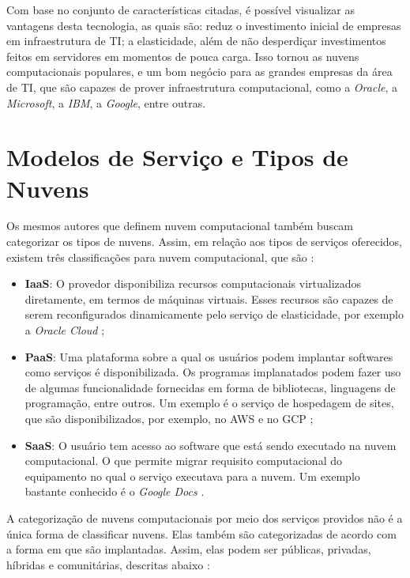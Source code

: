 Com base no conjunto de características citadas, é possível visualizar as vantagens desta tecnologia, as quais são: reduz o investimento inicial de empresas em infraestrutura de TI; a elasticidade, além de não desperdiçar investimentos feitos em servidores em momentos de pouca carga. Isso tornou as nuvens computacionais populares, e um bom negócio para as grandes empresas da área de \acrfull{TI}, que são capazes de prover infraestrutura computacional, como a \textit{Oracle}, a \textit{Microsoft}, a \textit{IBM}, a \textit{Google}, entre outras.

\section{Modelos de Serviço e Tipos de Nuvens}

Os mesmos autores que definem nuvem computacional também buscam categorizar os tipos de nuvens. Assim, em relação aos tipos de serviços oferecidos, existem três classificações para nuvem computacional, que são \cite{Vaquero:2008:BCT:1496091.1496100_Cloud_definition} \cite{NIST_CLOUD_DEFINITION}:

\begin{itemize}
	\item \textbf{\acrfull{IaaS}}: O provedor disponibiliza recursos computacionais virtualizados diretamente, em termos de máquinas virtuais. Esses recursos são capazes de serem reconfigurados dinamicamente pelo serviço de elasticidade, por exemplo a \textit{Oracle Cloud} \cite{OracleCloud};
	\item \textbf{\acrfull{PaaS}}: Uma plataforma sobre a qual os usuários podem implantar softwares como serviços é disponibilizada. Os programas implanatados podem fazer uso de algumas funcionalidade fornecidas em forma de bibliotecas, linguagens de programação, entre outros. Um exemplo é o serviço de hospedagem de sites\cite{PaaS_Hosting}, que são disponibilizados, por exemplo, no \acrfull{AWS} \cite{AWS_GPU} e no \acrfull{GCP} \cite{Google_Cloud_GPU};
	\item \textbf{\acrfull{SaaS}}: O usuário tem acesso ao software que está sendo executado na nuvem computacional. O que permite migrar requisito computacional do equipamento no qual o serviço executava para a nuvem. Um exemplo bastante conhecido é o \textit{Google Docs} \cite{GoogleDocs}.
\end{itemize}

A categorização de nuvens computacionais por meio dos serviços providos não é a única forma de classificar nuvens. Elas também são categorizadas de acordo com a forma em que são implantadas. Assim, elas podem ser públicas, privadas, híbridas e comunitárias, descritas abaixo \cite{NIST_CLOUD_DEFINITION}:

